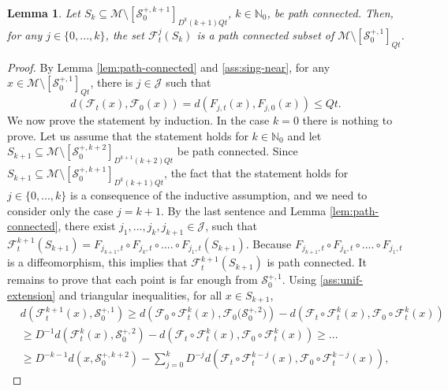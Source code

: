\documentclass{amsart}
\numberwithin{equation}{section}
\newtheorem{lemma}[theorem]{Lemma}
\renewcommand{\ge}{\geqslant}
\renewcommand{\le}{\leqslant}
\newcommand\cF{{\mathcal F}}
\newcommand\cJ{{\mathcal J}}
\newcommand\cM{{\mathcal M}}
\newcommand\cS{{\mathcal S}}
\newcommand\bN{{\mathbb N}}
\begin{document}
\begin{lemma}\label{lem:aux-zero}
Let \(S_k \subseteq \cM \setminus  [\cS_0^{+,k+1}]_{D^{k}\!(k+1)Qt}\), \(k \in \bN_0\), be path connected. Then, for any \(j \in \{0,...,k\}\), the set \(\cF^{j}_t\left( S_k\right)\) is a path connected subset of \(\cM \setminus [\cS_0^{+,1}]_{Qt}\).
\end{lemma}
\begin{proof}
By Lemma \ref{lem:path-connected} and \ref{ass:sing-near}, for any \(x \in \cM \setminus [\cS_{0}^{+,1}]_{Q t}\), there is \(j \in \cJ\) such that
\begin{equation}\label{eq:bound-simple}
d \left(\cF_t(x), \cF_0(x) \right) = d\left(F_{j,t}(x), F_{j,0}(x) \right) \le Qt.
\end{equation}
We now prove the statement by induction. In the case \(k = 0\) there is nothing to prove. Let us assume that the statement holds for \(k \in \bN_0\) and let \( S_{k+1} \subseteq  \cM \setminus  [\cS_0^{+,k+2}]_{D^{k+1}\!(k+2)Qt}\) be path connected. Since \(S_{k+1} \subseteq  \cM \setminus  [\cS_0^{+,k+1}]_{D^{k}\!(k+1)Qt}\), the fact that the statement holds for \(j \in \{0,...,k\}\) is a consequence of the inductive assumption, and we need to consider only the case \(j = k+1\). By the last sentence and Lemma \ref{lem:path-connected}, there exist \(j_1,..., j_{k}, j_{k+1} \in \cJ\), such that \(\cF_t^{k+1}\left(S_{k+1}\right) = F_{j_{k+1},t} \circ F_{j_{k},t} \circ ....\circ F_{j_1,t}\left(S_{k+1}\right)\). Because \(F_{j_{k+1},t} \circ F_{j_{k},t} \circ ....\circ F_{j_1,t}\) is a diffeomorphism, this implies that \(\cF_t^{k+1}\left(S_{k+1}\right)\) is path connected. It remains to prove that each point is far enough from \(\cS_0^{+,1}\). Using \ref{ass:unif-extension} and triangular inequalities, for all \(x \in S_{k+1}\),
\begin{equation}\label{eq:inductive-step-00}
\begin{split}
&d\left( \!\cF_t^{k+1}(x), \cS_0^{+,1} \!\right)  \!\ge \! d\left( \!\cF_0\circ \cF_t^{k}(x), \cF_0\bigl(\cS_0^{+,2}\bigr) \!\right)\!-\! d\left(\!\cF_t\circ \cF_t^{k}(x), \cF_0 \circ \cF_t^{k}(x)\!\right) \\
&\ge D^{-1}d\left( \cF_t^{k}(x), \cS_0^{+,2}\right) - d\left(\cF_t\circ \cF_t^{k}(x), \cF_0 \circ \cF_t^{k}(x)\right) \ge ...\\
& \ge D^{-k-1}d\left(x, \cS_0^{+,k+2}\right) - \sum_{j=0}^{k} D^{-j}d\left(\cF_t\circ \cF_t^{k-j}(x), \cF_0 \circ \cF_t^{k-j}(x)\right),
\end{split}
\end{equation}

\end{proof}
\end{document}
